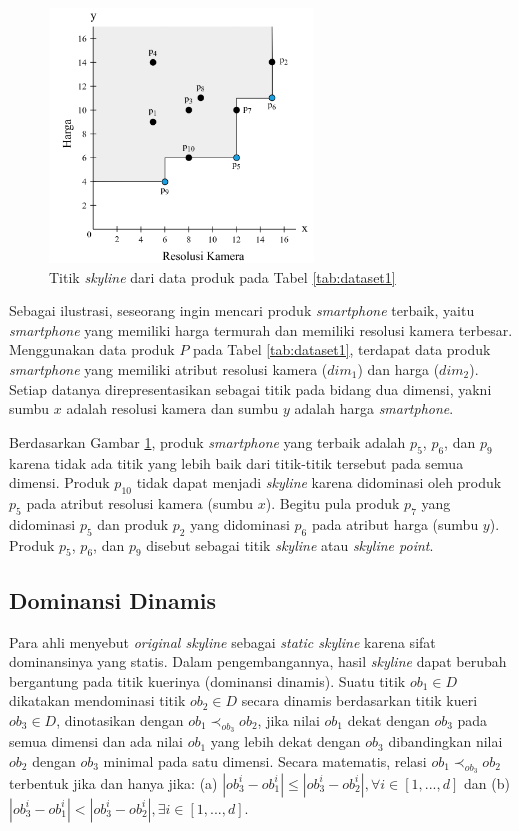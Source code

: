 \documentclass[conference]{IEEEtran}
\begin{document}
\begin{figure}[htbp]
	\centering
	\includegraphics[width=7cm]{img/bab2/skyline.png}
	\caption{Titik \textit{skyline} dari data produk pada Tabel \ref{tab:dataset1}}
	\label{fig:skyline}
\end{figure}

Sebagai ilustrasi, seseorang ingin mencari produk \textit{smartphone} terbaik, yaitu \textit{smartphone} yang memiliki harga termurah dan memiliki resolusi kamera terbesar. Menggunakan data produk $P$ pada Tabel \ref{tab:dataset1}, terdapat data produk \textit{smartphone} yang memiliki atribut resolusi kamera ($dim_1$) dan harga ($dim_2$). Setiap datanya direpresentasikan sebagai titik pada bidang dua dimensi, yakni sumbu $x$ adalah resolusi kamera dan sumbu $y$ adalah harga \textit{smartphone}.

Berdasarkan Gambar \ref{fig:skyline}, produk \textit{smartphone} yang terbaik adalah $p_5$, $p_6$, dan $p_9$ karena tidak ada titik yang lebih baik dari titik-titik tersebut pada semua dimensi. Produk $p_{10}$ tidak dapat menjadi \textit{skyline} karena didominasi oleh produk $p_5$ pada atribut resolusi kamera (sumbu $x$). Begitu pula produk $p_7$ yang didominasi $p_5$ dan produk $p_2$ yang didominasi $p_6$ pada atribut harga (sumbu $y$). Produk $p_5$, $p_6$, dan $p_9$ disebut sebagai titik \textit{skyline} atau \textit{skyline point}.

\subsection{Dominansi Dinamis}
Para ahli menyebut \textit{original skyline} sebagai \textit{static skyline} \cite{dynamic-skyline-2} karena sifat dominansinya yang statis. Dalam pengembangannya, hasil \textit{skyline} dapat berubah bergantung pada titik kuerinya (dominansi dinamis). Suatu titik $ob_1 \in D$ dikatakan mendominasi titik $ob_2 \in D$ secara dinamis berdasarkan titik kueri $ob_3 \in D$, dinotasikan dengan $ob_1 \prec_{ob_3} ob_2$, jika nilai $ob_1$ dekat dengan $ob_3$ pada semua dimensi dan ada nilai $ob_1$ yang lebih dekat dengan $ob_3$ dibandingkan nilai $ob_2$ dengan $ob_3$ minimal pada satu dimensi. Secara matematis, relasi $ob_1 \prec_{ob_3} ob_2$ terbentuk jika dan hanya jika: (a) $|ob_3^i - ob_1^i| \leq |ob_3^i - ob_2^i|, \forall i \in [1, ..., d]$ dan (b) $|ob_3^i - ob_1^i| < |ob_3^i - ob_2^i|, \exists i \in [1, ..., d]$.
\end{document}
